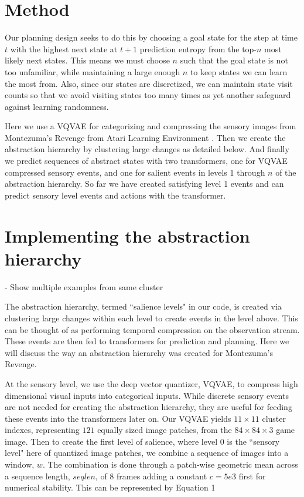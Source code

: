 \documentclass{article}
\begin{document}
\section{Method}

Our planning design seeks to do this by choosing a goal state for the step at time $t$ with the highest next state at $t + 1$ prediction entropy from the top-$n$ most likely next states. This means we must choose $n$ such that the goal state is not too unfamiliar, while maintaining a large enough $n$ to keep states we can learn the most from. Also, since our states are discretized, we can maintain state visit counts so that we avoid visiting states too many times as yet another safeguard against learning randomness.

\hspace{0pt}

Here we use a VQVAE \cite{oord2018neural}\cite{karpathy2021deepvectorquantization} for categorizing and compressing the sensory images from Montezuma's Revenge from Atari Learning Environment \cite{bellemare2013arcade}. Then we create the abstraction hierarchy by clustering large changes as detailed below. And finally we predict sequences of abstract states with two transformers\cite{vaswani2017attention}\cite{karpathy2020mingpt}, one for VQVAE compressed sensory events, and one for salient events in levels 1 through $n$ of the abstraction hierarchy. So far we have created satisfying level 1 events and can predict sensory level events and actions with the transformer.


\section{Implementing the abstraction hierarchy}
\label{sec:abstraction-hierarchy}

- Show multiple examples from same cluster

The abstraction hierarchy, termed \textquotedblleft salience levels" in our code, is created via clustering large changes within each level to create events in the level above. This can be thought of as performing temporal compression on the observation stream. These events are then fed to transformers for prediction and planning. Here we will discuss the way an abstraction hierarchy was created for Montezuma's Revenge.

At the sensory level, we use the deep vector quantizer, VQVAE, to compress high dimensional visual inputs into categorical inputs. While discrete sensory events are not needed for creating the abstraction hierarchy, they are useful for feeding these events into the transformers later on. Our VQVAE yields $11 \times 11$ cluster indexes, representing $121$ equally sized image patches, from the $84 \times 84 \times 3$ game image. Then to create the first level of salience, where level $0$ is the \textquotedblleft sensory level" here of quantized image patches, we combine a sequence of images into a window, $w$. The combination is done through a patch-wise geometric mean across a sequence length, $seqlen$, of 8 frames adding a constant $c=5e3$ first for numerical stability. This can be represented by
Equation 1
\end{document}
